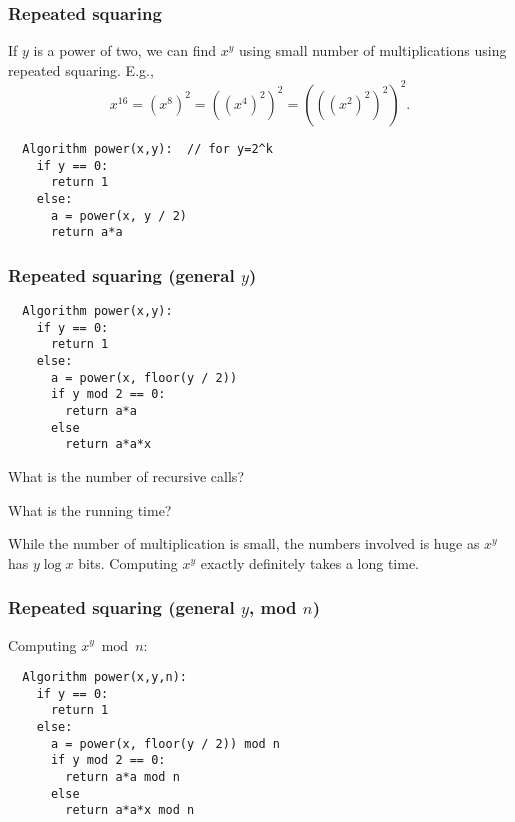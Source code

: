 \begin{frame}[fragile]
  \frametitle{Repeated squaring}

  If $y$ is a power of two, we can find $x^y$ using small number of
  multiplications using repeated squaring.  E.g.,
  \[
  x^{16} = (x^8)^2 = ((x^4)^2)^2 = (((x^2)^2)^2)^2.
  \]
  \pause

  \begin{tcolorbox}
  {\small
\begin{verbatim}
  Algorithm power(x,y):  // for y=2^k
    if y == 0:
      return 1
    else:
      a = power(x, y / 2)
      return a*a
\end{verbatim}
  }
  \end{tcolorbox}
\end{frame}

\begin{frame}[fragile]
  \frametitle{Repeated squaring (general $y$)}

  \begin{tcolorbox}
  {\small
\begin{verbatim}
  Algorithm power(x,y): 
    if y == 0:
      return 1
    else:
      a = power(x, floor(y / 2))
      if y mod 2 == 0:
        return a*a
      else
        return a*a*x
\end{verbatim}
  }
  \end{tcolorbox}

  \pause
  What is the number of recursive calls?

  \pause
  What is the running time?

  \pause While the number of multiplication is small, the numbers
  involved is huge as $x^y$ has $y\log x$ bits.  Computing $x^y$
  exactly definitely takes a long time.
\end{frame}

\begin{frame}[fragile]
  \frametitle{Repeated squaring (general $y$, mod $n$)}

  Computing $x^y \bmod n$:
  
  \begin{tcolorbox}
  {\small
\begin{verbatim}
  Algorithm power(x,y,n): 
    if y == 0:
      return 1
    else:
      a = power(x, floor(y / 2)) mod n
      if y mod 2 == 0:
        return a*a mod n
      else
        return a*a*x mod n
\end{verbatim}
  }
  \end{tcolorbox}

\end{frame}

